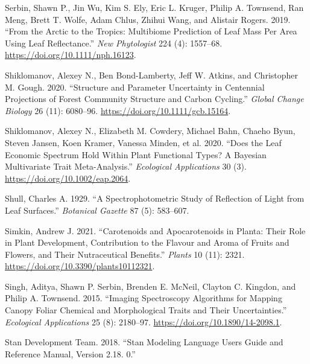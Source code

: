 \documentclass[
  letterpaper,
  DIV=11,
  numbers=noendperiod]{scrartcl}
\newlength{\cslhangindent}
\newlength{\cslentryspacingunit} %
\newenvironment{CSLReferences}[2] %
 {%
  \setlength{\parindent}{0pt}
  \ifodd #1
  \let\oldpar\par
  \def\par{\hangindent=\cslhangindent\oldpar}
  \fi
  \setlength{\parskip}{#2\cslentryspacingunit}
 }%
 {}
\begin{document}
\begin{CSLReferences}{1}{0}
\leavevmode{}%
Serbin, Shawn P., Jin Wu, Kim S. Ely, Eric L. Kruger, Philip A.
Townsend, Ran Meng, Brett T. Wolfe, Adam Chlus, Zhihui Wang, and
Alistair Rogers. 2019. {``From the Arctic to the Tropics: Multibiome
Prediction of Leaf Mass Per Area Using Leaf Reflectance.''} \emph{New
Phytologist} 224 (4): 1557--68. \url{https://doi.org/10.1111/nph.16123}.

\leavevmode{}%
Shiklomanov, Alexey N., Ben Bond-Lamberty, Jeff W. Atkins, and
Christopher M. Gough. 2020. {``Structure and Parameter Uncertainty in
Centennial Projections of Forest Community Structure and Carbon
Cycling.''} \emph{Global Change Biology} 26 (11): 6080--96.
\url{https://doi.org/10.1111/gcb.15164}.

\leavevmode{}%
Shiklomanov, Alexey N., Elizabeth M. Cowdery, Michael Bahn, Chaeho Byun,
Steven Jansen, Koen Kramer, Vanessa Minden, et al. 2020. {``Does the
Leaf Economic Spectrum Hold Within Plant Functional Types? A Bayesian
Multivariate Trait Meta{-}Analysis.''} \emph{Ecological Applications} 30
(3). \url{https://doi.org/10.1002/eap.2064}.

\leavevmode{}%
Shull, Charles A. 1929. {``A Spectrophotometric Study of Reflection of
Light from Leaf Surfaces.''} \emph{Botanical Gazette} 87 (5): 583--607.

\leavevmode{}%
Simkin, Andrew J. 2021. {``Carotenoids and Apocarotenoids in Planta:
Their Role in Plant Development, Contribution to the Flavour and Aroma
of Fruits and Flowers, and Their Nutraceutical Benefits.''}
\emph{Plants} 10 (11): 2321.
\url{https://doi.org/10.3390/plants10112321}.

\leavevmode{}%
Singh, Aditya, Shawn P. Serbin, Brenden E. McNeil, Clayton C. Kingdon,
and Philip A. Townsend. 2015. {``Imaging Spectroscopy Algorithms for
Mapping Canopy Foliar Chemical and Morphological Traits and Their
Uncertainties.''} \emph{Ecological Applications} 25 (8): 2180--97.
\url{https://doi.org/10.1890/14-2098.1}.

\leavevmode{}%
Stan Development Team. 2018. {``Stan Modeling Language Users Guide and
Reference Manual, Version 2.18. 0.''}


\end{CSLReferences}
\end{document}

